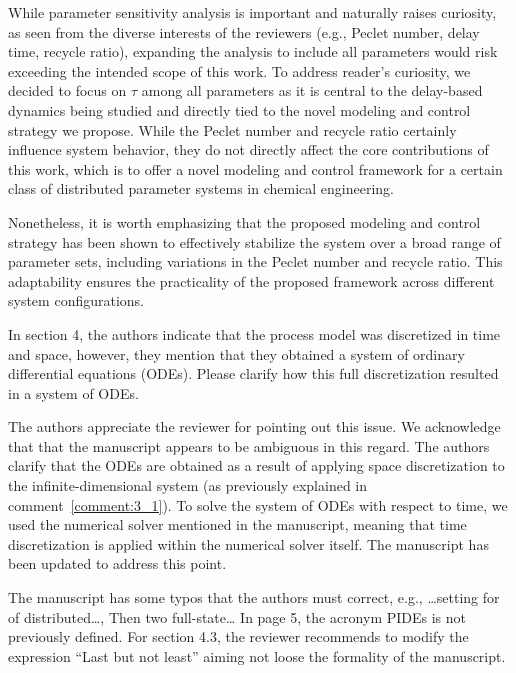 \documentclass[11pt,answers]{exam}
\begin{document}
\begin{questions}
\begin{solutionorbox}
        While parameter sensitivity analysis is important and naturally raises curiosity, as seen from the diverse interests of the reviewers (e.g., Peclet number, delay time, recycle ratio), expanding the analysis to include all parameters would risk exceeding the intended scope of this work. To address reader's curiosity, we decided to focus on \( \tau \) among all parameters as it is central to the delay-based dynamics being studied and directly tied to the novel modeling and control strategy we propose. While the Peclet number and recycle ratio certainly influence system behavior, they do not directly affect the core contributions of this work, which is to offer a novel modeling and control framework for a certain class of distributed parameter systems in chemical engineering.
    
        Nonetheless, it is worth emphasizing that the proposed modeling and control strategy has been shown to effectively stabilize the system over a broad range of parameter sets, including variations in the Peclet number and recycle ratio. This adaptability ensures the practicality of the proposed framework across different system configurations.
    \end{solutionorbox}


    \question In section 4, the authors indicate that the process model was discretized in time and space, however, they mention that they obtained a system of ordinary differential equations (ODEs). Please clarify how this full discretization resulted in a system of ODEs.

    \begin{solutionorbox} \label{comment:3_4}
        The authors appreciate the reviewer for pointing out this issue. We acknowledge that that the manuscript appears to be ambiguous in this regard. The authors clarify that the ODEs are obtained as a result of applying space discretization to the infinite-dimensional system (as previously explained in comment~\ref{comment:3_1}). To solve the system of ODEs with respect to time, we used the numerical solver mentioned in the manuscript, meaning that time discretization is applied within the numerical solver itself. The manuscript has been updated to address this point.
    \end{solutionorbox}


    \question The manuscript has some typos that the authors must correct, e.g., …setting for of distributed…, Then two full-state… In page 5, the acronym PIDEs is not previously defined. For section 4.3, the reviewer recommends to modify the expression “Last but not least” aiming not loose the formality of the manuscript.


\end{questions}
\end{document}
